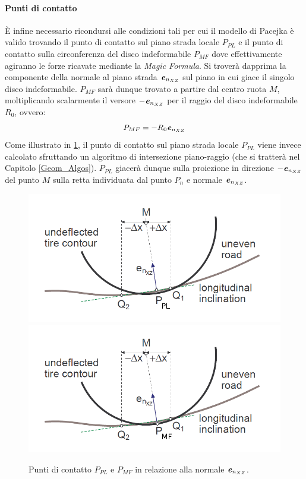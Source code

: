 \paragraph{Punti di contatto}
\label{Punti_contatto_rill}
È infine necessario ricondursi alle condizioni tali per cui il modello di Pacejka è valido trovando il punto di contatto sul piano strada locale $P_{PL}$ e il punto di contatto sulla circonferenza del disco indeformabile $P_{MF}$ dove effettivamente agiranno le forze ricavate mediante la \textit{Magic Formula}. Si troverà dapprima la componente della normale al piano strada $\textbf{\textit{e}}_{n_{XZ}}$ sul piano in cui giace il singolo disco indeformabile. $P_{MF}$ sarà dunque trovato a partire dal centro ruota $M$, moltiplicando scalarmente il versore $-\textbf{\textit{e}}_{n_{XZ}}$ per il raggio del disco indeformabile $R_0$, ovvero:
%
\begin{equation}
P_{MF} = -R_0\textbf{\textit{e}}_{n_{XZ}}
\label{puntoMF}
\end{equation}
%
Come illustrato in \figurename{ \ref{localplane}}, il punto di contatto sul piano strada locale $P_{PL}$ viene invece calcolato sfruttando un algoritmo di intersezione piano-raggio (che si tratterà nel Capitolo \ref{Geom_Algos}). $P_{PL}$ giacerà dunque sulla proiezione in direzione $-\textbf{\textit{e}}_{n_{XZ}}$ del punto $M$ sulla retta individuata dal punto $P_n$ e normale $\textbf{\textit{e}}_{n_{XZ}}$.

\begin{figure}[h]
	\centering
	\includegraphics[width=0.6\linewidth]{Figures/local_plane_PL}
	\includegraphics[width=0.6\linewidth]{Figures/local_plane_MF}
	\caption{Punti di contatto $P_{PL}$ e $P_{MF}$ in relazione alla normale $\textbf{\textit{e}}_{n_{XZ}}$.}
	\label{localplane}
\end{figure}

